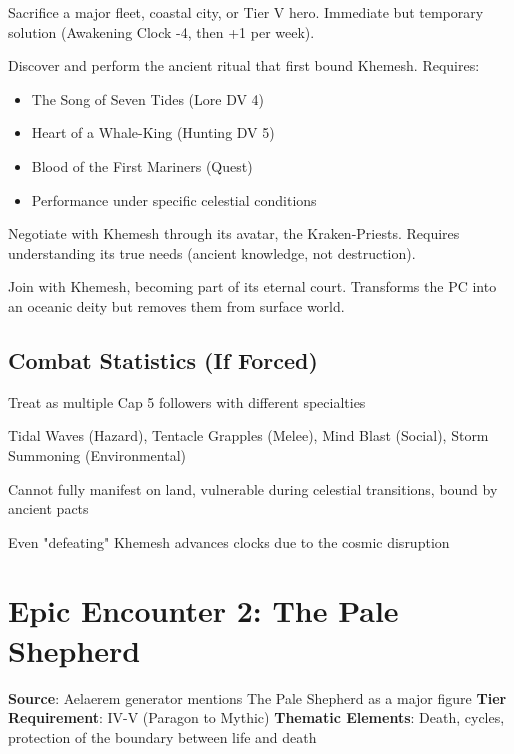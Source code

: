 \documentclass[11pt]{article}
\begin{document}
\begin{description}[leftmargin=*]
\item[Blood Tribute] Sacrifice a major fleet, coastal city, or Tier V hero. Immediate but temporary solution (Awakening Clock -4, then +1 per week).
\item[Binding Ritual] Discover and perform the ancient ritual that first bound Khemesh. Requires:
\begin{itemize}
\item The Song of Seven Tides (Lore DV 4)
\item Heart of a Whale-King (Hunting DV 5)  
\item Blood of the First Mariners (Quest)
\item Performance under specific celestial conditions
\end{itemize}
\item[Alliance] Negotiate with Khemesh through its avatar, the Kraken-Priests. Requires understanding its true needs (ancient knowledge, not destruction).
\item[Ascension] Join with Khemesh, becoming part of its eternal court. Transforms the PC into an oceanic deity but removes them from surface world.
\end{description}

\subsection*{Combat Statistics (If Forced)}

\begin{description}[leftmargin=*]
\item[Scale] Treat as multiple Cap 5 followers with different specialties
\item[Primary Forms] Tidal Waves (Hazard), Tentacle Grapples (Melee), Mind Blast (Social), Storm Summoning (Environmental)
\item[Weaknesses] Cannot fully manifest on land, vulnerable during celestial transitions, bound by ancient pacts
\item[Consequences] Even "defeating" Khemesh advances clocks due to the cosmic disruption
\end{description}

\section*{Epic Encounter 2: The Pale Shepherd}

\begin{mdframed}[backgroundcolor=epicbg]
\textbf{Source}: Aelaerem generator mentions The Pale Shepherd as a major figure
\textbf{Tier Requirement}: IV-V (Paragon to Mythic)
\textbf{Thematic Elements}: Death, cycles, protection of the boundary between life and death
\end{mdframed}
\end{document}
